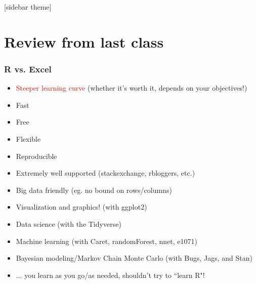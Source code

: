 \documentclass[xcolor=dvipsnames, 9pt]{beamer} %
\begin{document}
\begin{frame}
\end{frame}

[sidebar theme]
\section{Review from last class}

\begin{frame}
\frametitle{\textsf{R} vs. Excel}
\begin{itemize}
\item \textcolor{red}{Steeper learning curve} (whether it's worth it, depends on your objectives!)
\item Fast
\item Free
\item Flexible
\item Reproducible 
\item Extremely well supported (stackexchange, rbloggers, etc.)
\item Big data friendly (eg. no bound on rows/columns)
\item Visualization and graphics! (with ggplot2)
\item Data science (with the Tidyverse)
\item Machine learning (with Caret, randomForest, nnet, e1071)
\item Bayesian modeling/Markov Chain Monte Carlo (with Bugs, Jags, and Stan)
\item[] ... you learn as you go/as needed, shouldn't try to ``learn \textsf{R}"!
\end{itemize}
\end{frame}
\end{document}
